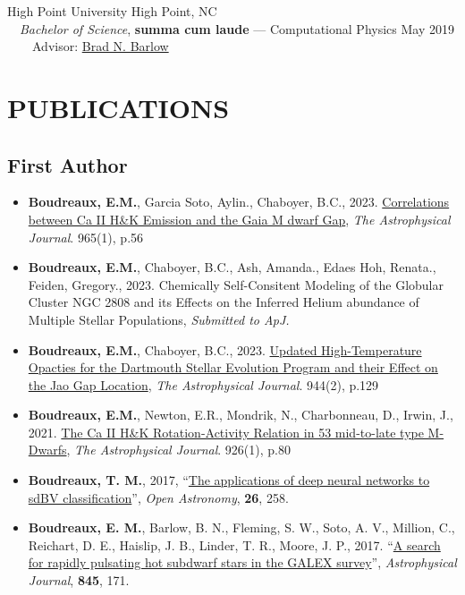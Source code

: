 \documentclass[margin, 10pt]{res} %
\begin{document}
\begin{resume}
{\large High Point University} \hfill High Point, NC\\
	{\-\ \-\ \small \textit{Bachelor of Science}, \textbf{summa cum laude} --- Computational Physics} \hfill May 2019\\
  {\-\ \-\ \-\ \-\ \small Advisor: \href{https://tarheels.live/bbarlow/}{Brad N. Barlow}} \\

\section{PUBLICATIONS}
\subsection{First Author}
\begin{itemize}
  \item \textbf{Boudreaux, E.M.}, Garcia Soto, Aylin., Chaboyer, B.C., 2023. \href{https://ui.adsabs.harvard.edu/abs/2024arXiv240214984B/abstract}{Correlations between Ca II H\&K Emission and the Gaia M dwarf Gap}, \textit{The Astrophysical Journal}. 965(1), p.56
  \item \textbf{Boudreaux, E.M.}, Chaboyer, B.C., Ash, Amanda., Edaes Hoh, Renata., Feiden, Gregory., 2023. Chemically Self-Consitent Modeling of the Globular Cluster NGC 2808 and its Effects on the Inferred Helium abundance of Multiple Stellar Populations, \textit{Submitted to ApJ.}
	\item \textbf{Boudreaux, E.M.}, Chaboyer, B.C., 2023. \href{https://ui.adsabs.harvard.edu/abs/2023arXiv230110798B/abstract}{Updated High-Temperature Opacties for the Dartmouth Stellar Evolution Program and their Effect on the Jao Gap Location}, \textit{The Astrophysical Journal}. 944(2), p.129
	\item \textbf{Boudreaux, E.M.}, Newton, E.R., Mondrik, N., Charbonneau, D., Irwin, J., 2021. \href{https://ui.adsabs.harvard.edu/abs/2022ApJ...929...80B/abstract}{The Ca II H\&K Rotation-Activity Relation in 53 mid-to-late type M-Dwarfs}, \textit{The Astrophysical Journal}. 926(1), p.80
\item \textbf{Boudreaux, T. M.}, 2017, ``\href{https://ui.adsabs.harvard.edu/#abs/2017OAst...26..258B/abstract}{The applications of deep neural networks to sdBV classification}'', \textit{Open Astronomy}, \textbf{26}, 258.
\item \textbf{Boudreaux, E. M.}, Barlow, B. N., Fleming, S. W., Soto, A. V., Million, C., Reichart, D. E., Haislip, J. B., Linder, T. R., Moore, J. P., 2017. ``\href{https://ui.adsabs.harvard.edu/#abs/2017ApJ...845..171B/abstract}{A search for rapidly pulsating hot subdwarf stars in the GALEX survey}'', \textit{Astrophysical Journal}, \textbf{845}, 171.
\end{itemize}

\end{resume}
\end{document}
